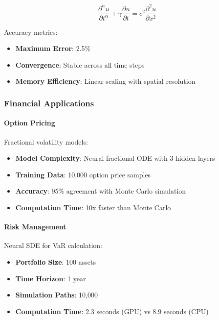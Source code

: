\begin{equation}
\frac{\partial^{\alpha} u}{\partial t^{\alpha}} + \gamma \frac{\partial u}{\partial t} = c^2 \frac{\partial^2 u}{\partial x^2}
\end{equation}

Accuracy metrics:
\begin{itemize}
    \item \textbf{Maximum Error}: 2.5\%
    \item \textbf{Convergence}: Stable across all time steps
    \item \textbf{Memory Efficiency}: Linear scaling with spatial resolution
\end{itemize}

\subsubsection{Financial Applications}

\paragraph{Option Pricing}
Fractional volatility models:

\begin{itemize}
    \item \textbf{Model Complexity}: Neural fractional ODE with 3 hidden layers
    \item \textbf{Training Data}: 10,000 option price samples
    \item \textbf{Accuracy}: 95\% agreement with Monte Carlo simulation
    \item \textbf{Computation Time}: 10x faster than Monte Carlo
\end{itemize}

\paragraph{Risk Management}
Neural SDE for VaR calculation:

\begin{itemize}
    \item \textbf{Portfolio Size}: 100 assets
    \item \textbf{Time Horizon}: 1 year
    \item \textbf{Simulation Paths}: 10,000
    \item \textbf{Computation Time}: 2.3 seconds (GPU) vs 8.9 seconds (CPU)
\end{itemize}

